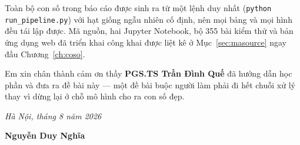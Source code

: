 Toàn bộ con số trong báo cáo được sinh ra từ một lệnh duy nhất
(\texttt{python run\_pipeline.py}) với hạt giống ngẫu nhiên cố định, nên mọi
bảng và mọi hình đều tái lập được. Mã nguồn, hai Jupyter Notebook, bộ 355 bài
kiểm thử và bản ứng dụng web đã triển khai công khai được liệt kê ở
Mục~\ref{sec:masource} ngay đầu Chương~\ref{ch:coso}.

Em xin chân thành cảm ơn thầy \textbf{PGS.TS Trần Đình Quế} đã hướng dẫn học
phần và đưa ra đề bài này --- một đề bài buộc người làm phải đi hết chuỗi xử lý
thay vì dừng lại ở chỗ mô hình cho ra con số đẹp.

\vspace{8mm}
\begin{flushright}
\emph{Hà Nội, tháng 8 năm 2026}\par
\vspace{2mm}
\textbf{Nguyễn Duy Nghĩa}
\end{flushright}
